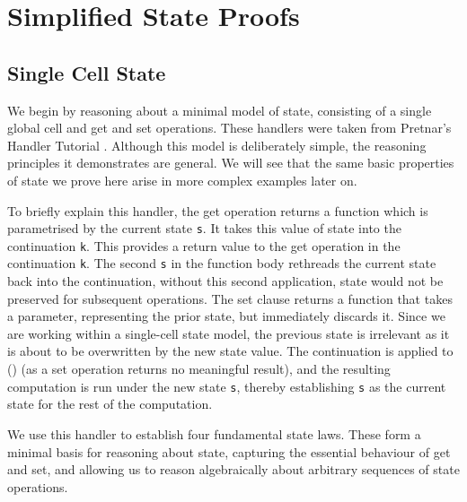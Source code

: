 \documentclass[logo,bsc,singlespacing,parskip]{infthesis}
\begin{document}
\section{Simplified State Proofs}
\subsection{Single Cell State}
\label{subsec:simplified-state}
We begin by reasoning about a minimal model of state, consisting of a single global cell and get and set operations. These handlers were taken from Pretnar's Handler Tutorial \cite{pretnar_introduction_2015}. Although this model is deliberately simple, the reasoning principles it demonstrates are general. We will see that the same basic properties of state we prove here arise in more complex examples later on.  


To briefly explain this handler, the get operation returns a function which is parametrised by the current state \lstinline{s}. It takes this value of state into the continuation \lstinline{k}. This provides a return value to the get operation in the continuation \lstinline{k}. The second \lstinline{s} in the function body rethreads the current state back into the continuation, without this second application, state would not be preserved for subsequent operations. 
The set clause returns a function that takes a parameter, representing the prior state, but immediately discards it. Since we are working within a single-cell state model, the previous state is irrelevant as it is about to be overwritten by the new state value. The continuation is applied to () (as a set operation returns no meaningful result), and the resulting computation is run under the new state \lstinline{s}, thereby establishing \lstinline{s} as the current state for the rest of the computation.

We use this handler to establish four fundamental state laws. These form a minimal basis for reasoning about state, capturing the essential behaviour of get and set, and allowing us to reason algebraically about arbitrary sequences of state operations.
\end{document}
